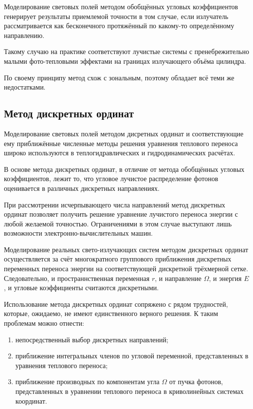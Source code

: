 \begin{FixLineStretch}
\begin{table}[h]
\begin{tabular}{|p{\wA}|p{\wB}|p{\wC}|}
		\end{tabular}
	\end{table}
\end{FixLineStretch}
\let\wC\relax
\let\wB\relax
\let\wA\relax

Моделирование световых полей методом обобщённых угловых коэффициентов генерирует результаты приемлемой точности в том случае, если излучатель рассматривается как бесконечного протяжённый по какому-то определённому направлению.

Такому случаю на практике соответствуют лучистые системы с пренебрежительно малыми фото-тепловыми эффектами на границах излучающего объёма цилиндра.

По своему принципу метод схож с зональным, поэтому обладает всё теми же недостатками.

\subsection{Метод дискретных ординат}

Моделирование световых полей методом дисретных ординат и соответствующие ему приближённые численные методы решения уравнения теплового переноса широко используются в теплогидравлических и гидродинамических расчётах.

В основе метода дискретных ординат, в отличие от метода обобщённых угловых коэффициентов, лежит то, что угловое лучистое распределение фотонов оценивается в различных дискретных направлениях.

При рассмотрении исчерпывающего числа направлений метод дискретных ординат позволяет получить решение уравнение лучистого переноса энергии с любой желаемой точностью.
Ограничениями в этом случае выступают лишь возможности электронно-вычислительных машин.

Моделирование реальных свето-излучающих систем методом дискретных ординат осуществляется за счёт многократного группового приближения дискретных переменных переноса энергии на соответствующей дискретной трёхмерной сетке.
Следовательно, и пространнственная переменная $r$, и направление $\Omega$, и энергия $E$, и угловые коэффициенты считаются дискретными.

Использование метода дискретных ординат сопряжено с рядом трудностей, которые, ожидаемо, не имеют единственного верного решения. К таким проблемам можно отнести:
\begin{enumerate}
	\item непосредственный выбор дискретных направлений;
	\item приближение интегральных членов по угловой переменной, представленных в уравнения теплового переноса;
	\item приближение производных по компонентам угла $\Omega$ от пучка фотонов, представленных в уравнении теплового переноса в криволинейных системах координат.
\end{enumerate}

